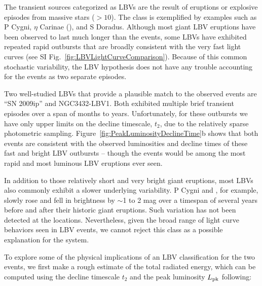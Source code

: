 \begin{multicols}{2}
The transient sources categorized as LBVs are the result of eruptions
or explosive episodes from massive stars ($>10$\Msun).
The class is exemplified by examples such as P Cygni, $\eta$ Carinae (\etaCar),
and S Doradus\cite{Smith:2011b, Kochanek:2012}.  Although most giant
LBV eruptions have been observed to last much longer than the \spock
events\cite{Smith:2011b}, some LBVs have exhibited repeated rapid
outbursts that are broadly consistent with the very fast \spock light
curves (see SI Fig.~\ref{fig:LBVLightCurveComparison}). Because of
this common stochastic variability, the LBV hypothesis does not
have any trouble accounting for the \spock events as two separate
episodes.

Two well-studied LBVs that provide a plausible match to the observed
\spock events are ``SN 2009ip''\cite{Maza:2009} and
NGC3432-LBV1\cite{Pastorello:2010}.  Both exhibited multiple brief
transient episodes over a span of months to years\cite{Miller:2009,
  Li:2009, Berger:2009, Drake:2010, Pastorello:2010}.  Unfortunately,
for these outbursts we have only upper limits on the decline
timescale, $t_2$, due to the relatively sparse photometric sampling.
Figure~\ref{fig:PeakLuminosityDeclineTime}b shows that both \spock
events are consistent with the observed luminosities and decline times
of these fast and bright LBV outbursts -- though the \spock events
would be among the most rapid and most luminous LBV eruptions ever
seen.

In addition to those relatively short and very bright giant eruptions,
most LBVs also commonly exhibit a slower underlying variability. P
Cygni and \etaCar, for example, slowly rose and fell in brightness by
$\sim$1 to 2 mag over a timespan of several years before and after
their historic giant eruptions.  Such variation has not been detected
at the \spock locations. Nevertheless, given the broad
range of light curve behaviors seen in LBV events, we cannot reject
this class as a possible explanation for the \spock system.

To explore some of the physical implications of an LBV classification
for the two \spock events, we first make a rough estimate of the total
radiated energy, which can be computed using the decline timescale
$t_2$ and the peak luminosity $L_{\rm pk}$
following\cite{Smith:2011b}:


\end{multicols}
